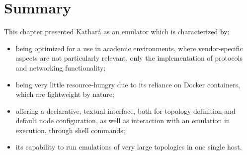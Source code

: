 \section{Summary}
\label{sec:katharasummary}

This chapter presented Kathará as an emulator which is characterized by:
\begin{itemize}
  \item being optimized for a use in academic environments, where vendor-specific aspects are not particularly relevant, only the implementation of protocols and networking functionality;
  \item being very little resource-hungry due to its reliance on Docker containers, which are lightweight by nature;
  \item offering a declarative, textual interface, both for topology definition and default node configuration, as well as interaction with an emulation in execution, through shell commands;
  \item its capability to run emulations of very large topologies in one single host.
\end{itemize}

